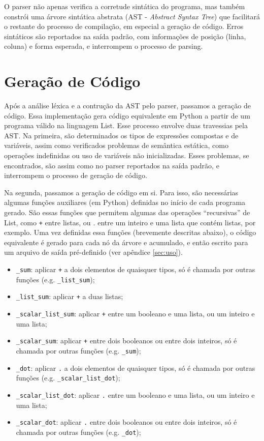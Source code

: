 \documentclass{article}
\begin{document}
O parser não apenas verifica a corretude sintática do programa, mas também constrói uma árvore sintática abstrata (AST - \textit{Abstract Syntax Tree}) que facilitará o restante do processo de compilação, em especial a geração de código. Erros sintáticos são reportados na saída padrão, com informações de posição (linha, coluna) e forma esperada, e interrompem o processo de parsing.

\section{Geração de Código}
\label{sec:geracao}
Após a análise léxica e a contrução da AST pelo parser, passamos a geração de código. Essa implementação gera código equivalente em Python a partir de um programa válido na linguagem List. Esse processo envolve duas travessias pela AST. Na primeira, são determinados os tipos de expressões compostas e de variáveis, assim como verificados problemas de semântica estática, como operações indefinidas ou uso de variáveis não inicializadas. Esses problemas, se encontrados, são assim como no parser reportados na saída padrão, e interrompem o processo de geração de código.

Na segunda, passamos a geração de código em si. Para isso, são necessárias algumas funções auxiliares (em Python) definidas no início de cada programa gerado. São essas funções que permitem algumas das operações ``recursivas'' de List, como \texttt{+} entre listas, ou \textit{.} entre um inteiro e uma lista que contém listas, por exemplo. Uma vez definidas essa funções (brevemente descritas abaixo), o código equivalente é gerado para cada nó da árvore e acumulado, e então escrito para um arquivo de saída pré-definido (ver apêndice \ref{sec:uso}).

\begin{itemize}
\item \texttt{\_sum}: aplicar \texttt{+} a dois elementos de quaisquer tipos, só é chamada por outras funções (e.g. \texttt{\_list\_sum});
\item \texttt{\_list\_sum}: aplicar \texttt{+} a duas listas;
\item \texttt{\_scalar\_list\_sum}: aplicar \texttt{+} entre um booleano e uma lista, ou um inteiro e uma lista;
\item \texttt{\_scalar\_sum}: aplicar \texttt{+} entre dois booleanos ou entre dois inteiros, só é chamada por outras funções (e.g. \texttt{\_sum});
\item \texttt{\_dot}: aplicar \texttt{.} a dois elementos de quaisquer tipos, só é chamada por outras funções (e.g. \texttt{\_scalar\_list\_dot});
\item \texttt{\_scalar\_list\_dot}: aplicar \texttt{.} entre um booleano e uma lista, ou um inteiro e uma lista;
\item \texttt{\_scalar\_dot}: aplicar \texttt{.} entre dois booleanos ou entre dois inteiros, só é chamada por outras funções (e.g. \texttt{\_dot});
\end{itemize}
\end{document}
